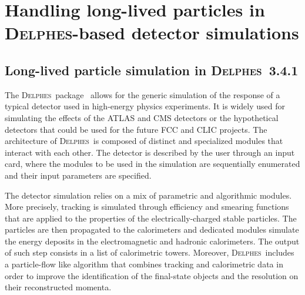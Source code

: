 
\newcommand{\MG}{\textsc{MadGraph}~5\_aMC@NLO}
\newcommand{\PY}{\textsc{Pythia}~8}
\newcommand{\MA}{\textsc{MadAnalysis}~5}
\newcommand{\MW}{\textsc{MadWidth}}
\newcommand{\MAnorm}{{MadAnalysis}~5}
\newcommand{\FJ}{\textsc{FastJet}}
\newcommand{\DEL}{\textsc{Delphes}}
\newcommand{\ROOT}{\textsc{Root}}




\section{Handling long-lived particles in \DEL-based detector simulations}
\label{sec:ch5-recastingDelphes}

\subsection{Long-lived particle simulation in \DEL~3.4.1}

The \DEL\ package~\cite{deFavereau:2013fsa} allows for the generic simulation of
the response of a typical detector used in high-energy physics experiments. It
is widely used for simulating the effects of the ATLAS and CMS detectors or the
hypothetical detectors that could be used for the future FCC and CLIC projects.
The architecture of \DEL\ is composed of distinct
and specialized modules that interact with each other. The detector is described
by the user through an input card, where the modules to be used in the
simulation are sequentially enumerated and their input parameters are specified.

The detector simulation relies on a mix of parametric and algorithmic
modules. More precisely, tracking is simulated through efficiency and smearing
functions that are applied to the properties of the electrically-charged stable
particles. The particles are then propagated to the calorimeters and dedicated
modules simulate the energy deposits in the electromagnetic and hadronic
calorimeters. The output of such step consists in a list of calorimetric towers.
Moreover, \DEL\ includes a particle-flow like
algorithm that combines tracking and calorimetric data in order to
improve the identification of the final-state objects and the resolution on
their reconstructed momenta.

